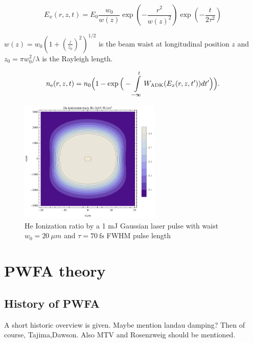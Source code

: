 \begin{equation}
E_{x}(r,z,t)=E_0\frac{w_0}{w(z)}\exp(-\frac{r^2}{w(z)^2})\exp(-\frac{t}{2\tau^2})
\end{equation}

$w(z)=w_0(1+(\frac{z}{z_0})^2)^{1/2}$ is the beam waist at longitudinal position $z$ and $z_0=\pi w_0^2/\lambda$ is the Rayleigh length.

\begin{equation}
n_\mathrm{e}(r,z,t) = n_0 \Big(1-\exp\Big(-\int \limits_{-\infty}^t W_\mathrm{ADK}(E_{x}(r,z,t'))dt'\Big)\Big).
\end{equation}

\begin{figure}
\centering
\includegraphics[width=0.6\textwidth]{theory/images/raw/Ionization_Torch_contourplot.pdf}
\caption{He Ionization ratio by a 1 mJ Gaussian laser pulse with waist $w_0=20\ \mu m$ and $\tau = 70\ \mathrm{fs}$ FWHM pulse length}
\label{img:Torch_contourplot}

\end{figure}



\section{PWFA theory}
\subsection{History of PWFA}
A short historic overview is given. 
Maybe mention landau damping? Then of course, Tajima,Dawson. Also MTV and Rosenzweig should be mentioned.
